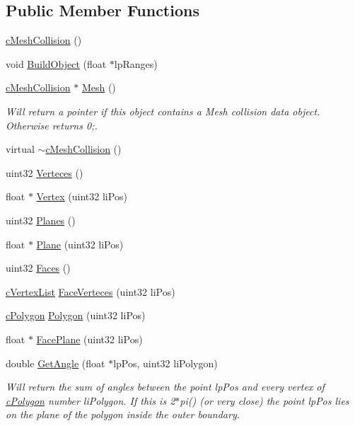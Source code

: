 \subsection*{Public Member Functions}
\begin{DoxyCompactItemize}
\item 
\hyperlink{classc_mesh_collision_a67899b5eb8dcb5e0c3500a39a52d9ed7}{cMeshCollision} ()
\item 
void \hyperlink{classc_mesh_collision_a49a69f58cf68f61f995119c077c26a75}{BuildObject} (float $\ast$lpRanges)
\item 
\hyperlink{classc_mesh_collision}{cMeshCollision} $\ast$ \hyperlink{classc_mesh_collision_ae4056e65fc6992e2d76d65291aca812f}{Mesh} ()
\begin{DoxyCompactList}\small\item\em Will return a pointer if this object contains a Mesh collision data object. Otherwise returns 0;. \item\end{DoxyCompactList}\item 
virtual \hyperlink{classc_mesh_collision_a9457c10bddfadac70a57c07480fa44fb}{$\sim$cMeshCollision} ()
\item 
uint32 \hyperlink{classc_mesh_collision_a320c5e5f6f54144bce8f7b8ca0c7ac16}{Verteces} ()
\item 
float $\ast$ \hyperlink{classc_mesh_collision_ab93a75b10efc76b6bc79db256160f708}{Vertex} (uint32 liPos)
\item 
uint32 \hyperlink{classc_mesh_collision_a853eb76f9fdfa0171d666894041f73c3}{Planes} ()
\item 
float $\ast$ \hyperlink{classc_mesh_collision_ad98fb9187728c385c40f5ec3cd105d0b}{Plane} (uint32 liPos)
\item 
uint32 \hyperlink{classc_mesh_collision_ae6f99888d6401c90c5679b671f5b582c}{Faces} ()
\item 
\hyperlink{classc_vertex_list}{cVertexList} \hyperlink{classc_mesh_collision_a53d2d9a604c23f8492af61b1f78b61f5}{FaceVerteces} (uint32 liPos)
\item 
\hyperlink{classc_polygon}{cPolygon} \hyperlink{classc_mesh_collision_a7ee274f062764d3f229e3134ae720db3}{Polygon} (uint32 liPos)
\item 
float $\ast$ \hyperlink{classc_mesh_collision_a4bb3d32151bf4e95f53b3af69cc297ad}{FacePlane} (uint32 liPos)
\item 
double \hyperlink{classc_mesh_collision_a7526a36774985d7304f37df574b6e069}{GetAngle} (float $\ast$lpPos, uint32 liPolygon)
\begin{DoxyCompactList}\small\item\em Will return the sum of angles between the point lpPos and every vertex of \hyperlink{classc_polygon}{cPolygon} number liPolygon. If this is 2$\ast$pi() (or very close) the point lpPos lies on the plane of the polygon inside the outer boundary. \item\end{DoxyCompactList}\end{DoxyCompactItemize}
